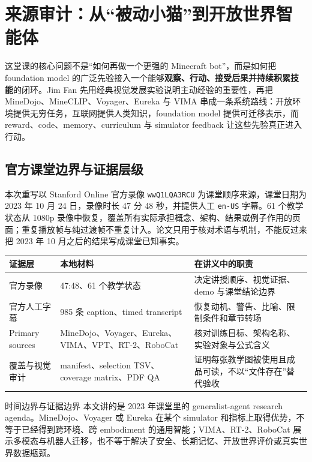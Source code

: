 \section{来源审计：从“被动小猫”到开放世界智能体}

这堂课的核心问题不是“如何再做一个更强的 Minecraft bot”，而是如何把 foundation model 的广泛先验接入一个能够\textbf{观察、行动、接受后果并持续积累技能}的闭环。Jim Fan 先用经典视觉发展实验说明主动经验的重要性，再把 MineDojo、MineCLIP、Voyager、Eureka 与 VIMA 串成一条系统路线：开放环境提供无穷任务，互联网提供人类知识，foundation model 提供可迁移表示，而 reward、code、memory、curriculum 与 simulator feedback 让这些先验真正进入行动。

\subsection{官方课堂边界与证据层级}

本次重写以 Stanford Online 官方录像 \texttt{wwQ1LQA3RCU} 为课堂顺序来源，课堂日期为 2023 年 10 月 24 日，录像时长 47 分 48 秒，并提供人工 \texttt{en-US} 字幕。61 个教学状态从 1080p 录像中恢复，覆盖所有实际承担概念、架构、结果或例子作用的页面；重复播放帧与纯过渡帧不重复计入。论文只用于核对术语与机制，不能反过来把 2023 年 10 月之后的结果写成课堂已知事实。

\begin{longtable}{@{}L{0.18\textwidth}L{0.31\textwidth}L{0.40\textwidth}@{}}
\toprule
证据层 & 本地材料 & 在讲义中的职责 \\
\midrule
官方录像 & 47:48、61 个教学状态 & 决定讲授顺序、视觉证据、demo 与课堂结论边界 \\
官方人工字幕 & 985 条 caption、timed transcript & 恢复动机、警告、比喻、限制条件和章节转场 \\
Primary sources & MineDojo、Voyager、Eureka、VIMA、VPT、RT-2、RoboCat & 核对训练目标、架构名称、实验对象与公式含义 \\
覆盖与视觉审计 & manifest、selection TSV、coverage matrix、PDF QA & 证明每张教学图被使用且成品可读，不以“文件存在”替代验收 \\
\bottomrule
\end{longtable}

\begin{warningbox}{时间边界与证据边界}
本文讲的是 2023 年课堂里的 generalist-agent research agenda。MineDojo、Voyager 或 Eureka 在某个 simulator 和指标上取得优势，不等于已经得到跨环境、跨 embodiment 的通用智能；VIMA、RT-2、RoboCat 展示多模态与机器人迁移，也不等于解决了安全、长期记忆、开放世界评价或真实世界数据瓶颈。
\end{warningbox}


